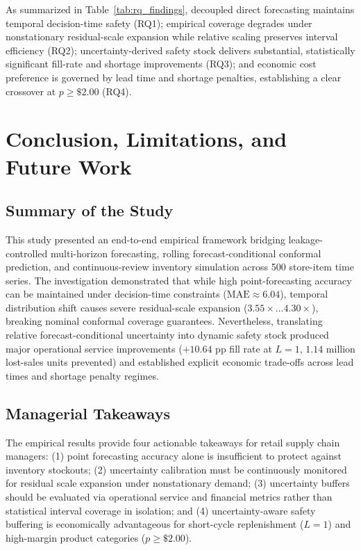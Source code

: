 \documentclass[11pt,a4paper]{article}
\begin{document}
As summarized in Table~\ref{tab:rq_findings}, decoupled direct forecasting maintains temporal decision-time safety (RQ1); empirical coverage degrades under nonstationary residual-scale expansion while relative scaling preserves interval efficiency (RQ2); uncertainty-derived safety stock delivers substantial, statistically significant fill-rate and shortage improvements (RQ3); and economic cost preference is governed by lead time and shortage penalties, establishing a clear crossover at $p \ge \$2.00$ (RQ4).

\section{Conclusion, Limitations, and Future Work}
\label{sec:conclusion}

\subsection{Summary of the Study}
\label{sec:concl_summary}
This study presented an end-to-end empirical framework bridging leakage-controlled multi-horizon forecasting, rolling forecast-conditional conformal prediction, and continuous-review inventory simulation across 500 store-item time series. The investigation demonstrated that while high point-forecasting accuracy can be maintained under decision-time constraints ($\text{MAE} \approx 6.04$), temporal distribution shift causes severe residual-scale expansion ($3.55\times\dots4.30\times$), breaking nominal conformal coverage guarantees. Nevertheless, translating relative forecast-conditional uncertainty into dynamic safety stock produced major operational service improvements ($+10.64$ pp fill rate at $L=1$, $1.14$ million lost-sales units prevented) and established explicit economic trade-offs across lead times and shortage penalty regimes.

\subsection{Managerial Takeaways}
\label{sec:concl_managerial}
The empirical results provide four actionable takeaways for retail supply chain managers: (1) point forecasting accuracy alone is insufficient to protect against inventory stockouts; (2) uncertainty calibration must be continuously monitored for residual scale expansion under nonstationary demand; (3) uncertainty buffers should be evaluated via operational service and financial metrics rather than statistical interval coverage in isolation; and (4) uncertainty-aware safety buffering is economically advantageous for short-cycle replenishment ($L=1$) and high-margin product categories ($p \ge \$2.00$).
\end{document}
